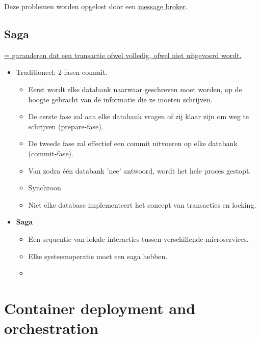 \documentclass{report}
\begin{document}
	Deze problemen worden opgelost door een \underline{message broker}.

	\chapter{Saga}
	\underline{= garanderen dat een transactie ofwel volledig, ofwel niet uitgevoerd wordt.}
	\begin{itemize}
		\item[\info] Traditioneel: 2-fasen-commit.
		\begin{itemize}
			\item[\info] Eerst wordt elke databank naarwaar geschreven moet worden, op de hoogte gebracht van de informatie die ze moeten schrijven.
			\item[\info] De eerste fase zal aan elke databank vragen of zij klaar zijn om weg te schrijven (prepare-fase).
			\item[\info] De tweede fase zal effectief een commit uitvoeren op elke databank (commit-fase).
			\item[\info] Van zodra één databank 'nee' antwoord, wordt het hele proces gestopt.
			\item[\alert] Synchroon
			\item[\alert] Niet elke database implementeert het concept van transacties en locking.
		\end{itemize}
		\item[\info] \textbf{Saga}
		\begin{itemize}
			\item[\info] Een sequentie van lokale interacties tussen verschillende microservices.
			\item[\info] Elke systeemoperatie moet een saga hebben.
			\item[\info] 
		\end{itemize}
	\end{itemize}
	
	\part{Container deployment and orchestration}
\end{document}
